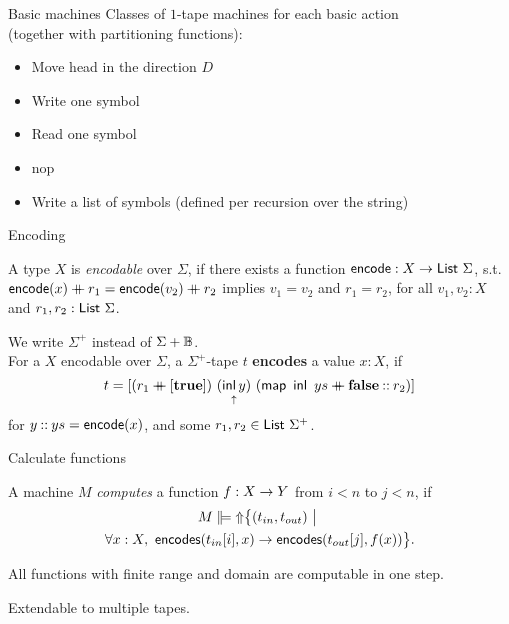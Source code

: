\begin{frame}{Basic machines}
  Classes of $1$-tape machines for each basic action \\(together with partitioning functions):
  \begin{itemize}
    \item Move head in the direction $D$
    \item Write one symbol
    \item Read one symbol
    \item nop
    \pause%
    \item Write a list of symbols (defined per recursion over the string)
  \end{itemize}
\end{frame}

\begin{frame}{Encoding}
  \begin{definition}
    A type $X$ is \emph{encodable} over $\Sigma$, if there exists a function $\textsf{encode} : X \rightarrow \textsf{List}~\Sigma$, s.t.
    $\textsf{encode}(x) \mathbin{+\mkern-10mu+} r_1 = \textsf{encode}(v_2) \mathbin{+\mkern-10mu+} r_2$
    implies $v_1 = v_2$ and $r_1 = r_2$, for all $v_1,v_2 : X$ and $r_1,r_2: \textsf{List}~\Sigma$.
  \end{definition}
  \pause%
  \begin{definition}
    We write $\Sigma^+$ instead of $\Sigma + \mathbb{B}$. \\
    For a $X$ encodable over $\Sigma$, a $\Sigma^+$-tape $t$ \textbf{encodes} a value $x:X$, if
    $$t = [ (r_1 \mathbin{+\mkern-10mu+} [\mathbf{true}])~\underset{\uparrow}{(\operatorname{\textsf{inl}} y)}~(\textsf{map}~\operatorname{\textsf{inl}}~ys \mathbin{+\mkern-10mu+} \mathbf{false} \mathbin{::} r_2) ] $$
    for $y \mathbin{::} ys = \textsf{encode}(x)$, and some $r_1, r_2 \in \textsf{List}~\Sigma^+$.
  \end{definition}
\end{frame}

\begin{frame}{Calculate functions}
  \begin{definition}
    A machine $M$ \emph{computes} a function $f : X \rightarrow Y$ from $i < n$ to $j < n$, if
    \begin{multline*}
      M \VDash \ignoreParam \setMap{(t_{in}, t_{out})}{\\
      \forall x:X,~ \MS{encodes}(t_{in}[i], x) \rightarrow \MS{encodes}(t_{out}[j], f(x))}.
    \end{multline*}
  \end{definition}
  \pause%
  \begin{lemma}
    All functions with finite range and domain are computable in one step.
  \end{lemma}
  \pause%
  Extendable to multiple tapes.
\end{frame}

